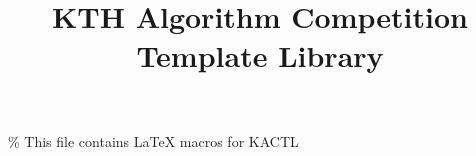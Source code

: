 \% This file contains LaTeX macros for KACTL

\usepackage[utf8]{inputenc}             %
\usepackage{listings}                   %
\usepackage{framed}                     %
\usepackage[a4paper,landscape,hmargin={0.5cm,0.5cm},vmargin={1.0cm,0.4cm}]{geometry}
\usepackage{multicol}                   %
\usepackage{fancyhdr}                   %
\usepackage{amsbsy, amssymb, amsmath}   %
\usepackage{tocloft}                    %
\usepackage{titletoc}                   %
\usepackage{ifthen}                     %
\usepackage{courier}                    %
\usepackage{graphicx}                   %
\usepackage{fix-cm}                     %
\usepackage{paralist}                   %
\usepackage[inline]{enumitem}           %
\usepackage[parfill]{parskip}           %
\usepackage[dvipsnames]{xcolor}
\usepackage[normalem]{ulem}
\usepackage[hidelinks]{hyperref}        %

\newcommand{\subtitle}[1]{
	\def\@subtitle{#1}
}
\newcommand{\team}[2]{
	\def\@teamname{#1}
	\def\@teammembers{#2}
}
\newcommand{\contest}[2]{
	\def\@contestname{#1}
	\def\@contestdate{#2}
}
\newcommand{\university}[3]{
	\def\@unishort{#1}
	\def\@unilong{#2}
	\def\@unilogo{#3}
}

\newcommand{\enablecolors}{
	\lstset{basicstyle=\footnotesize\ttfamily\color{mygreen}}
	\lstset{commentstyle=\color{darkgray}\normalfont\itshape}
	\lstset{keywordstyle=\color{myblue}}
	\lstset{identifierstyle=\color{black}}
}

\subtitle{{\tiny new}KACTL}
\title{KTH Algorithm Competition Template Library}
\newcommand{\PDFColor}{0}
\def\@builddir{build}

\def\today{\number\year-\ifthenelse{\number\month<10}{0}{}\number\month-\ifthenelse{\number\day<10}{0}{}\number\day} %

\renewcommand{\maketitle}[2]{
	\begin{center}
		{\Huge \@title}\\
		{\huge \@subtitle{} version #2}\\[0.1cm]
		{\Huge \textsc{#1}}
	\end{center}
}

